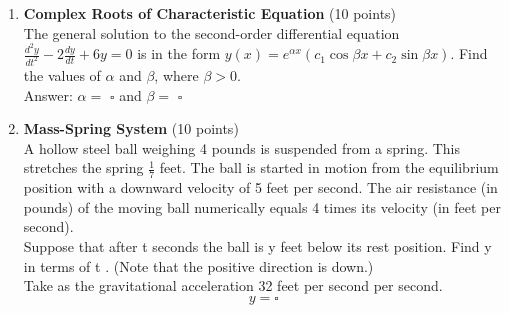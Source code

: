 \begin{enumerate}
  \item \textbf{Complex Roots of Characteristic Equation} (10 points)\\
  The general solution to the second-order differential equation $\frac{d^2 y}{d t^2}-2 \frac{d y}{d t}+6 y=0$ is in the form $y(x)=e^{\alpha x}\left(c_1 \cos \beta x+c_2 \sin \beta x\right)$. Find the values of $\alpha$ and $\beta$, where $\beta>0$.\\
  Answer: $\alpha=$ $\square$ and $\beta=$ $\square$\\
  \begin{subanswer}
  \end{subanswer}

  \newpage

  \item \textbf{Mass-Spring System} (10 points)\\
  A hollow steel ball weighing 4 pounds is suspended from a spring. This stretches the spring $\frac{1}{7}$ feet. The ball is started in motion from the equilibrium position with a downward velocity of 5 feet per second. The air resistance (in pounds) of the moving ball numerically equals 4 times its velocity (in feet per second).\\
  Suppose that after t seconds the ball is y feet below its rest position. Find y in terms of t . (Note that the positive direction is down.)\\
  Take as the gravitational acceleration 32 feet per second per second.
  $$
  y=\square
  $$
  \begin{subanswer}
  \end{subanswer}

  \newpage


\end{enumerate}
